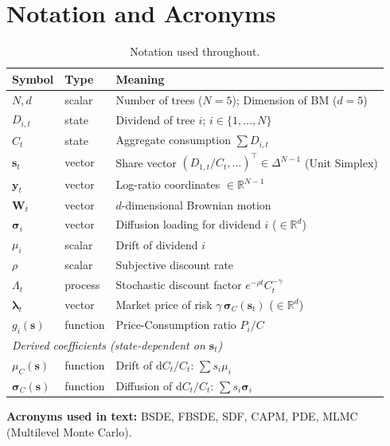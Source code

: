 \documentclass[11pt,letterpaper,oneside]{article}
\numberwithin{equation}{section}
\newcommand{\ac}[1]{{\mdseries\textsc{#1}}}
\newcommand{\R}{\mathbb{R}}
\newcommand{\1}{\mathbf{1}}
\newcommand{\diff}{\mathrm{d}}
\begin{document}
\newpage
\section{Notation and Acronyms}

\begin{table}[ht]
  \centering
  \small
  \begin{tabular}{@{} l l p{}@{}}
  \toprule
  \textbf{Symbol} & \textbf{Type} & \textbf{Meaning} \\
  \midrule
  $N, d$ & scalar & Number of trees ($N=5$); Dimension of BM ($d=5$) \\
  $D_{i,t}$ & state & Dividend of tree $i$; $i\in\{1,\dots,N\}$ \\
  $C_t$ & state & Aggregate consumption $\sum D_{i,t}$ \\
  $\bm{s}_t$ & vector & Share vector $(D_{1,t}/C_t, \dots)^\top \in \Delta^{N-1}$ (Unit Simplex) \\
  $\bm{y}_t$ & vector & Log-ratio coordinates $\in \R^{N-1}$ \\
  $\bm{W}_t$ & vector & $d$-dimensional Brownian motion \\
  $\bm{\sigma}_i$ & vector & Diffusion loading for dividend $i$ ($\in \R^d$) \\
  $\mu_i$ & scalar & Drift of dividend $i$ \\
  $\rho$ & scalar & Subjective discount rate \\
  $\Lambda_t$ & process & Stochastic discount factor $e^{-\rho t} C_t^{-\gamma}$ \\
  $\bm{\lambda}_t$ & vector & Market price of risk $\gamma\,\bm{\sigma}_C(\bm{s}_t)$ ($\in \R^d$) \\
  $g_i(\bm{s})$ & function & Price-Consumption ratio $P_i/C$ \\
  \midrule
  \multicolumn{3}{l}{\textit{Derived coefficients (state-dependent on $\bm{s}_t$)}} \\
  $\mu_C(\bm{s})$ & function & Drift of $\diff C_t/C_t$: $\sum s_i\mu_i$ \\
  $\bm{\sigma}_C(\bm{s})$ & function & Diffusion of $\diff C_t/C_t$: $\sum s_i\bm{\sigma}_i$ \\
  \bottomrule
  \end{tabular}
  \caption{Notation used throughout.}
\end{table}

\medskip

\noindent\textbf{Acronyms used in text:} \ac{BSDE}, \ac{FBSDE}, \ac{SDF}, \ac{CAPM}, \ac{PDE}, \ac{MLMC} (Multilevel Monte Carlo).
\medskip
\clearpage
\end{document}
